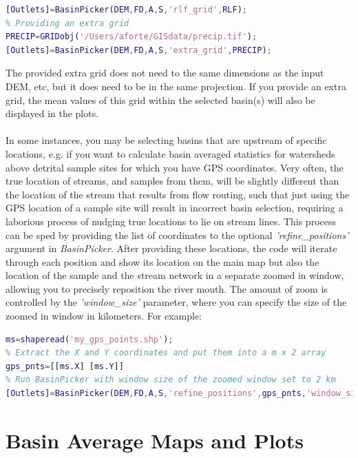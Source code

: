 \begin{lstlisting}[language=Matlab]
% Providing a precomputed relief grid
[Outlets]=BasinPicker(DEM,FD,A,S,'rlf_grid',RLF);
% Providing an extra grid
PRECIP=GRIDobj('/Users/aforte/GISdata/precip.tif');
[Outlets]=BasinPicker(DEM,FD,A,S,'extra_grid',PRECIP);
\end{lstlisting}

\noindent
The provided extra grid does not need to the same dimensions as the input DEM, etc, but it does need to be in the same projection. If you provide an extra grid, the mean values of this grid within the selected basin(s) will also be displayed in the plots. 

\paragraph{}In some instances, you may be selecting basins that are upstream of specific locations, e.g. if you want to calculate basin averaged statistics for watersheds above detrital sample sites for which you have GPS coordinates. Very often, the true location of streams, and samples from them, will be slightly different than the location of the stream that results from flow routing, such that just using the GPS location of a sample site will result in incorrect basin selection, requiring a laborious process of nudging true locations to lie on stream lines. This process can be sped by providing the list of coordinates to the optional \textit{'refine\_positions'} argument in \textit{BasinPicker}. After providing these locations, the code will iterate through each position and show its location on the main map but also the location of the sample and the stream network in a separate zoomed in window, allowing you to precisely reposition the river mouth. The amount of zoom is controlled by the \textit{'window\_size'} parameter, where you can specify the size of the zoomed in window in kilometers. For example:

\begin{lstlisting}[language=Matlab]
% Load a shapefile containing your GPS coordinates
ms=shaperead('my_gps_points.shp');
% Extract the X and Y coordinates and put them into a m x 2 array
gps_pnts=[[ms.X] [ms.Y]]
% Run BasinPicker with window size of the zoomed window set to 2 km
[Outlets]=BasinPicker(DEM,FD,A,S,'refine_positions',gps_pnts,'window_size',2);
\end{lstlisting}

\section{Basin Average Maps and Plots}

